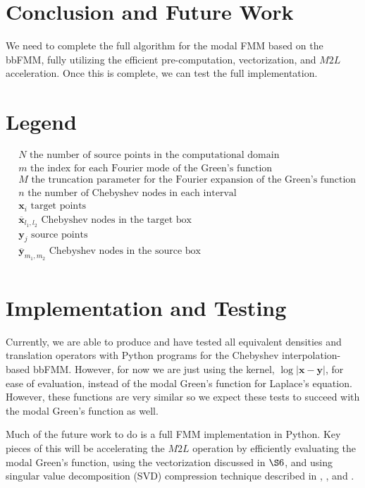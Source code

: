 \documentclass[11pt, oneside]{article}   	%
\begin{document}
\section{Conclusion and Future Work}
We need to complete the full algorithm for the modal FMM based on the bbFMM, fully utilizing the efficient pre-computation, vectorization, and $M2L$ acceleration. Once this is complete, we can test the full implementation.

\begin{appendices}
\section{Legend}
\begin{align*}
&N \mbox{ the number of source points in the computational domain}\\
&m \mbox{ the index for each Fourier mode of the Green's function}\\
&M \mbox{ the truncation parameter for the Fourier expansion of the Green's function}\\
&n \mbox{ the number of Chebyshev nodes in each interval}\\
&\mathbf{x}_i\mbox{ target points}\\
&\mathbf{\overline{x}}_{l_1,l_2}\mbox{ Chebyshev nodes in the target box}\\
&\mathbf{y}_j\mbox{ source points}\\
&\mathbf{\overline{y}}_{m_1,m_2}\mbox{ Chebyshev nodes in the source box}\\
\end{align*}

\section{Implementation and Testing}
Currently, we are able to produce and have tested all equivalent densities and translation operators with Python programs for the Chebyshev interpolation-based bbFMM. However, for now we are just using the kernel, $\log|\mathbf{x}-\mathbf{y}|$, for ease of evaluation, instead of the modal Green's function for Laplace's equation. However, these functions are very similar so we expect these tests to succeed with the modal Green's function as well.

Much of the future work to do is a full FMM implementation in Python. Key pieces of this will be accelerating the $M2L$ operation by efficiently evaluating the modal Green's function, using the vectorization discussed in $\S6$, and using singular value decomposition (SVD) compression technique described in \cite{CGMR}, \cite{FD}, \cite{ZGR} and \cite{MV}.


\end{appendices}
\end{document}
